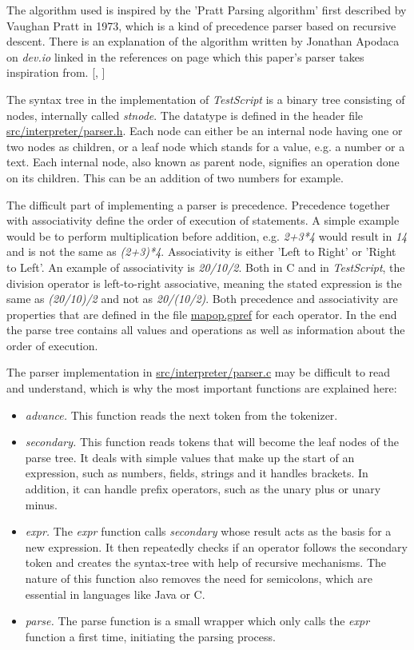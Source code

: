 \documentclass[12pt,a4paper]{article}
\newcommand{\hrc}[1]{\hyperref[#1]{#1}}
\newcommand{\name}{\emph{TestScript}}
\begin{document}
The algorithm used is inspired by the 'Pratt Parsing
algorithm' first described by Vaughan Pratt in 1973, which is a kind of precedence
parser based on recursive descent. There is an explanation of the algorithm
written by Jonathan Apodaca on \emph{dev.io} linked in the references on page 
\pageref{bibliography} which this paper's parser takes inspiration from.
[, ]

The syntax tree in the implementation of \name{} is a binary tree consisting of nodes, internally
called \emph{stnode}. The datatype is defined in the header file \hrc{src/interpreter/parser.h}.
Each node can either be an internal node having one or two nodes as children, or a leaf node
which stands for a value, e.g. a number or a text. Each internal node, also known as parent node, signifies
an operation done on its children. This can be an addition of two numbers for example. 

The difficult part of implementing a parser is precedence. Precedence together
with associativity define the order of execution of statements. A simple example
would be to perform multiplication before addition, e.g. \emph{2+3*4} would
result in \emph{14} and is not the same as \emph{(2+3)*4}.
Associativity is either 'Left to Right' or 'Right to Left'. An example of associativity is
\emph{20/10/2}. Both in C and in \name{}, the division operator is
left-to-right associative, meaning the stated expression is the same as
\emph{(20/10)/2} and not as \emph{20/(10/2)}. Both precedence 
and associativity are properties that are defined in the file \hrc{mapop.gpref} for
each operator.
In the end the parse tree contains all values and 
operations as well as information about the order of execution.

The parser implementation in \hrc{src/interpreter/parser.c} may be difficult to
read and understand, which is why the most important functions are explained here:
\begin{itemize}
    \item \emph{advance.} This function reads the next token from the tokenizer.
    \item \emph{secondary.} This function reads tokens that will become the leaf nodes
        of the parse tree.
        It deals with simple values that make up the start of an expression, such as numbers,
        fields, strings and it handles brackets. 
        In addition, it can handle prefix operators, such as the unary plus or unary minus.
    \item \emph{expr.} The \emph{expr} function calls \emph{secondary} whose result acts
        as the basis for a new expression. It then repeatedly checks
        if an operator follows the secondary token and creates the syntax-tree
        with help of recursive mechanisms. The nature of this function also 
        removes the need for semicolons,
        which are essential in languages like Java or C.
    \item \emph{parse.} The parse function is a small wrapper which only
        calls the \emph{expr} function a first time, initiating the parsing process.
\end{itemize}
\end{document}
